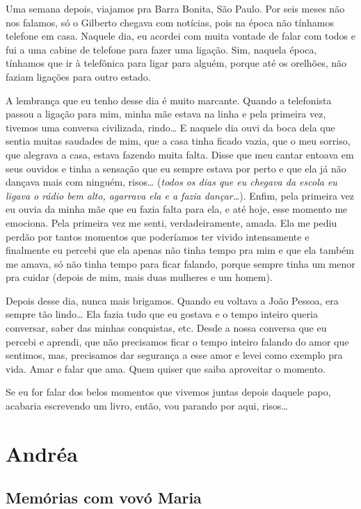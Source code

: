 \documentclass[
  brazil,
  a6paper,
  oneside,
  landscape,
  14pt]{scrbook}
\begin{document}
Uma semana depois, viajamos pra Barra Bonita, São Paulo. Por seis meses
não nos falamos, só o Gilberto chegava com notícias, pois na época não
tínhamos telefone em casa. Naquele dia, eu acordei com muita vontade de
falar com todos e fui a uma cabine de telefone para fazer uma ligação.
Sim, naquela época, tínhamos que ir à telefônica para ligar para alguém,
porque até os orelhões, não faziam ligações para outro estado.

A lembrança que eu tenho desse dia é muito marcante. Quando a
telefonista passou a ligação para mim, minha mãe estava na linha e pela
primeira vez, tivemos uma conversa civilizada, rindo\ldots{} E naquele
dia ouvi da boca dela que sentia muitas saudades de mim, que a casa
tinha ficado vazia, que o meu sorriso, que alegrava a casa, estava
fazendo muita falta. Disse que meu cantar entoava em seus ouvidos e
tinha a sensação que eu sempre estava por perto e que ela já não dançava
mais com ninguém, risos\ldots{} (\emph{todos os dias que eu chegava da
escola eu ligava o rádio bem alto, agarrava ela e a fazia
dançar\ldots{}}). Enfim, pela primeira vez eu ouvia da minha mãe que eu
fazia falta para ela, e até hoje, esse momento me emociona. Pela
primeira vez me senti, verdadeiramente, amada. Ela me pediu perdão por
tantos momentos que poderíamos ter vivido intensamente e finalmente eu
percebi que ela apenas não tinha tempo pra mim e que ela também me
amava, só não tinha tempo para ficar falando, porque sempre tinha um
menor pra cuidar (depois de mim, mais duas mulheres e um homem).

Depois desse dia, nunca mais brigamos. Quando eu voltava a João Pessoa,
era sempre tão lindo\ldots{} Ela fazia tudo que eu gostava e o tempo
inteiro queria conversar, saber das minhas conquistas, etc. Desde a
nossa conversa que eu percebi e aprendi, que não precisamos ficar o
tempo inteiro falando do amor que sentimos, mas, precisamos dar
segurança a esse amor e levei como exemplo pra vida. Amar e falar que
ama. Quem quiser que saiba aproveitar o momento.

Se eu for falar dos belos momentos que vivemos juntas depois daquele
papo, acabaria escrevendo um livro, então, vou parando por aqui,
risos\ldots{}

\hypertarget{andruxe9a}{%
\section{Andréa}\label{andruxe9a}}

\hypertarget{memuxf3rias-com-vovuxf3-maria}{%
\subsection{Memórias com vovó
Maria}\label{memuxf3rias-com-vovuxf3-maria}}
\end{document}
